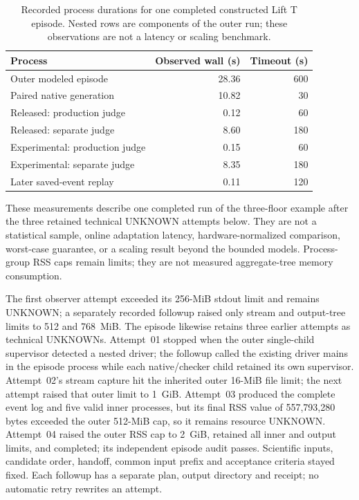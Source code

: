 \begin{table}[htbp]
\centering\small
\caption{Recorded process durations for one completed constructed
Lift T episode. Nested rows are components of the outer run;
these observations are not a latency or scaling benchmark.}
\label{tab:lift-episode-observed-times}
\begin{tabular}{@{}lrr@{}}
\toprule
Process & Observed wall (s) & Timeout (s)\\
\midrule
Outer modeled episode & 28.36 & 600\\
\quad Paired native generation & 10.82 & 30\\
\quad Released: production judge & 0.12 & 60\\
\quad Released: separate judge & 8.60 & 180\\
\quad Experimental: production judge & 0.15 & 60\\
\quad Experimental: separate judge & 8.35 & 180\\
Later saved-event replay & 0.11 & 120\\
\bottomrule
\end{tabular}
\end{table}

These measurements describe one completed run of the three-floor
example after the three retained technical UNKNOWN attempts below.
They are not a statistical sample, online adaptation latency,
hardware-normalized comparison, worst-case guarantee, or a scaling
result beyond the bounded models. Process-group RSS caps remain limits;
they are not measured aggregate-tree memory consumption.

The first observer attempt exceeded its 256-MiB stdout limit and
remains UNKNOWN; a separately recorded followup raised only stream
and output-tree limits to 512 and 768~MiB. The episode likewise retains
three earlier attempts as technical UNKNOWNs. Attempt~01 stopped when
the outer single-child supervisor detected a nested driver; the
followup called the existing driver mains in the episode process while
each native/checker child retained its own supervisor.
Attempt~02's stream capture hit the inherited outer 16-MiB file limit;
the next attempt raised that outer limit to 1~GiB.
Attempt~03 produced the complete event log and five valid inner
processes, but its final  RSS value of 557,793,280 bytes
exceeded the outer 512-MiB cap, so it remains resource UNKNOWN.
Attempt~04 raised the outer RSS cap to 2~GiB, retained all inner and
output limits, and completed; its independent episode audit passes.
Scientific inputs, candidate order, handoff, common input prefix and
acceptance criteria stayed fixed. Each followup has a separate plan,
output directory and receipt; no automatic retry rewrites an attempt.

